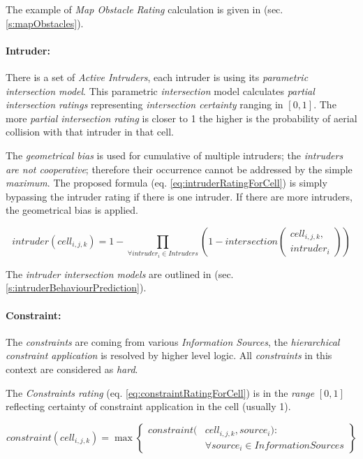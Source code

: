 \noindent The example of \emph{Map Obstacle Rating} calculation is given in (sec. \ref{s:mapObstacles}).


\paragraph{Intruder:} There is a set of \emph{Active Intruders}, each intruder is using its \emph{parametric intersection model}. This parametric \emph{intersection} model calculates \emph{partial intersection ratings} representing \emph{intersection certainty} ranging in $[0,1]$. The more \emph{partial intersection rating} is closer to 1 the higher is the probability of aerial collision with that intruder in that cell. 

The \emph{geometrical bias} is used for cumulative of multiple intruders; the \emph{intruders are not cooperative}; therefore their occurrence cannot be addressed by the simple \emph{maximum}. The proposed formula (eq. \ref{eq:intruderRatingForCell}) is simply bypassing the intruder rating if there is one intruder. If there  are more intruders, the geometrical bias is applied.


\begin{equation}\label{eq:intruderRatingForCell}
    intruder(cell_{i,j,k}) = 1 - \prod_{\forall intruder_i \in Intruders} \left(1- intersection\left(\begin{gathered}cell_{i,j,k},\\intruder_i\end{gathered}\right)\right)
\end{equation}

\noindent The \emph{intruder intersection models} are outlined in (sec. \ref{s:intruderBehaviourPrediction}). 

\paragraph{Constraint:} The \emph{constraints} are coming from various \emph{Information Sources}, the \emph{hierarchical constraint application} is resolved by higher level logic. All \emph{constraints} in this context are considered as \emph{hard}.

The \emph{Constraints rating} (eq. \ref{eq:constraintRatingForCell}) is in the \emph{range} $[0,1]$ reflecting certainty of constraint application in the cell (usually 1).

\begin{equation}\label{eq:constraintRatingForCell}
    constraint(cell_{i,j,k}) = \max \left\{\begin{aligned}constraint(&cell_{i,j,k},source_i):\\&\forall source_i \in InformationSources\end{aligned}\right\}
\end{equation}

